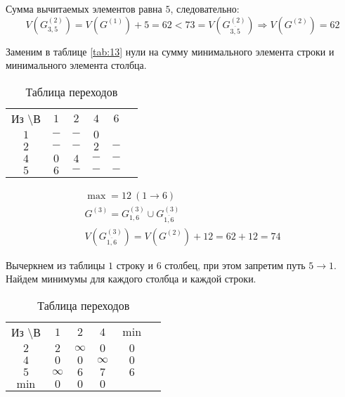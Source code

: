 Сумма вычитаемых элементов равна $5$, следовательно:
\begin{equation*}
V(G_{3,5}^{(2)}) = V(G^{(1)}) + 5 = 62 < 73 = V(G_{\overline{3,5}}^{(2)}) \Rightarrow V(G^{(2)}) = 62
\end{equation*}

Заменим в таблице \ref{tab:13} нули на сумму минимального элемента строки и минимального элемента столбца.

\begin{table}[H]
\begin{center}
	\def\tabcolsep{15pt}
	\caption{Таблица переходов}
	\label{tab:14}
	\begin{tabular}{|c||c|c|c|c|c|}
		\hline
		Из \textbackslash В & $1$ & $2$ & $4$ & $6$\\
		\hhline{|=#=|=|=|=|}
		$1$ & $-$ & $-$ & $0$ & \redbold{$12$} \\
		\hline
		$2$ & $-$ & $-$ & $2$ & $-$ \\
		\hline
		$4$ & $0$ & $4$ & $-$ & $-$ \\
		\hline
		$5$ & $6$ & $-$ & $-$ & $-$ \\
		\hline
	\end{tabular}
\end{center}
\end{table}

\begin{gather*}
\max = 12\ (1 \rightarrow 6) \\
G^{(3)} = G_{1,6}^{(3)} \cup G_{\overline{1,6}}^{(3)} \\
V(G_{\overline{1,6}}^{(3)}) = V(G^{(2)}) + 12 = 62 + 12 = 74
\end{gather*}

Вычеркнем из таблицы $1$ строку и $6$ столбец, при этом запретим путь $5 \rightarrow 1$. Найдем минимумы для каждого столбца и каждой строки.

\begin{table}[H]
\begin{center}
	\def\tabcolsep{15pt}
	\caption{Таблица переходов}
	\label{tab:15}
	\begin{tabular}{|c||c|c|c|c|c|}
		\hline
		Из \textbackslash В & $1$ & $2$ & $4$ & $\min$ \\
		\hhline{|=#=|=|=|=|}
		$2$ & $2$ & $\infty$ & $0$ & $0$ \\
		\hline
		$4$ & $0$ & $0$ & $\infty$ & $0$ \\
		\hline
		$5$ & $\infty$ & $6$ & $7$ & $6$ \\
		\hhline{|=#=|=|=|=|} 
		$\min$ & $0$ & $0$ & $0$ & \\ 
		\hline
	\end{tabular}
\end{center}
\end{table}


